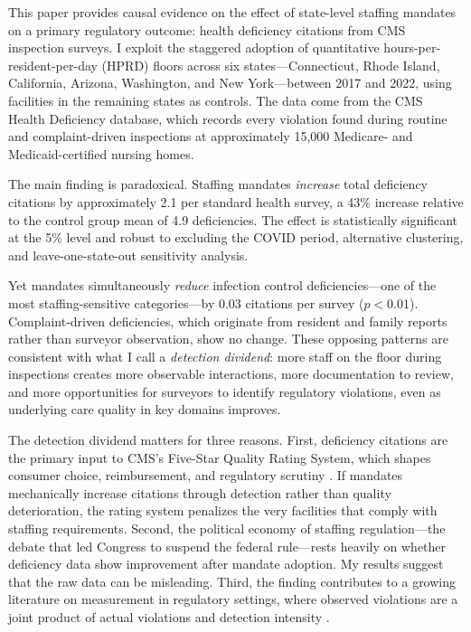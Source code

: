 \documentclass[12pt]{article}
\begin{document}
This paper provides causal evidence on the effect of state-level staffing mandates on a primary regulatory outcome: health deficiency citations from CMS inspection surveys. I exploit the staggered adoption of quantitative hours-per-resident-per-day (HPRD) floors across six states---Connecticut, Rhode Island, California, Arizona, Washington, and New York---between 2017 and 2022, using facilities in the remaining states as controls. The data come from the CMS Health Deficiency database, which records every violation found during routine and complaint-driven inspections at approximately 15,000 Medicare- and Medicaid-certified nursing homes.

The main finding is paradoxical. Staffing mandates \textit{increase} total deficiency citations by approximately 2.1 per standard health survey, a 43\% increase relative to the control group mean of 4.9 deficiencies. The effect is statistically significant at the 5\% level and robust to excluding the COVID period, alternative clustering, and leave-one-state-out sensitivity analysis.

Yet mandates simultaneously \textit{reduce} infection control deficiencies---one of the most staffing-sensitive categories---by 0.03 citations per survey ($p < 0.01$). Complaint-driven deficiencies, which originate from resident and family reports rather than surveyor observation, show no change. These opposing patterns are consistent with what I call a \textit{detection dividend}: more staff on the floor during inspections creates more observable interactions, more documentation to review, and more opportunities for surveyors to identify regulatory violations, even as underlying care quality in key domains improves.

The detection dividend matters for three reasons. First, deficiency citations are the primary input to CMS's Five-Star Quality Rating System, which shapes consumer choice, reimbursement, and regulatory scrutiny \citep{werner2012, grabowski2020}. If mandates mechanically increase citations through detection rather than quality deterioration, the rating system penalizes the very facilities that comply with staffing requirements. Second, the political economy of staffing regulation---the debate that led Congress to suspend the federal rule---rests heavily on whether deficiency data show improvement after mandate adoption. My results suggest that the raw data can be misleading. Third, the finding contributes to a growing literature on measurement in regulatory settings, where observed violations are a joint product of actual violations and detection intensity \citep{glaeser2001, duflo2013, mccrary2017}.
\end{document}
